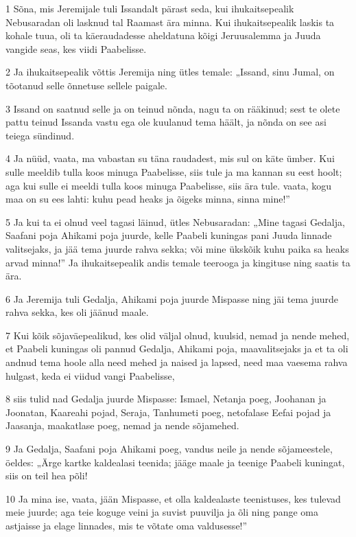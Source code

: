 \par 1 Sõna, mis Jeremijale tuli Issandalt pärast seda, kui ihukaitsepealik Nebusaradan oli lasknud tal Raamast ära minna. Kui ihukaitsepealik laskis ta kohale tuua, oli ta käeraudadesse aheldatuna kõigi Jeruusalemma ja Juuda vangide seas, kes viidi Paabelisse.
\par 2 Ja ihukaitsepealik võttis Jeremija ning ütles temale: „Issand, sinu Jumal, on tõotanud selle õnnetuse sellele paigale.
\par 3 Issand on saatnud selle ja on teinud nõnda, nagu ta on rääkinud; sest te olete pattu teinud Issanda vastu ega ole kuulanud tema häält, ja nõnda on see asi teiega sündinud.
\par 4 Ja nüüd, vaata, ma vabastan su täna raudadest, mis sul on käte ümber. Kui sulle meeldib tulla koos minuga Paabelisse, siis tule ja ma kannan su eest hoolt; aga kui sulle ei meeldi tulla koos minuga Paabelisse, siis ära tule. vaata, kogu maa on su ees lahti: kuhu pead heaks ja õigeks minna, sinna mine!”
\par 5 Ja kui ta ei olnud veel tagasi läinud, ütles Nebusaradan: „Mine tagasi Gedalja, Saafani poja Ahikami poja juurde, kelle Paabeli kuningas pani Juuda linnade valitsejaks, ja jää tema juurde rahva sekka; või mine ükskõik kuhu paika sa heaks arvad minna!” Ja ihukaitsepealik andis temale teerooga ja kingituse ning saatis ta ära.
\par 6 Ja Jeremija tuli Gedalja, Ahikami poja juurde Mispasse ning jäi tema juurde rahva sekka, kes oli jäänud maale.
\par 7 Kui kõik sõjaväepealikud, kes olid väljal olnud, kuulsid, nemad ja nende mehed, et Paabeli kuningas oli pannud Gedalja, Ahikami poja, maavalitsejaks ja et ta oli andnud tema hoole alla need mehed ja naised ja lapsed, need maa vaesema rahva hulgast, keda ei viidud vangi Paabelisse,
\par 8 siis tulid nad Gedalja juurde Mispasse: Ismael, Netanja poeg, Joohanan ja Joonatan, Kaareahi pojad, Seraja, Tanhumeti poeg, netofalase Eefai pojad ja Jaasanja, maakatlase poeg, nemad ja nende sõjamehed.
\par 9 Ja Gedalja, Saafani poja Ahikami poeg, vandus neile ja nende sõjameestele, öeldes: „Ärge kartke kaldealasi teenida; jääge maale ja teenige Paabeli kuningat, siis on teil hea põli!
\par 10 Ja mina ise, vaata, jään Mispasse, et olla kaldealaste teenistuses, kes tulevad meie juurde; aga teie koguge veini ja suvist puuvilja ja õli ning pange oma astjaisse ja elage linnades, mis te võtate oma valdusesse!”

